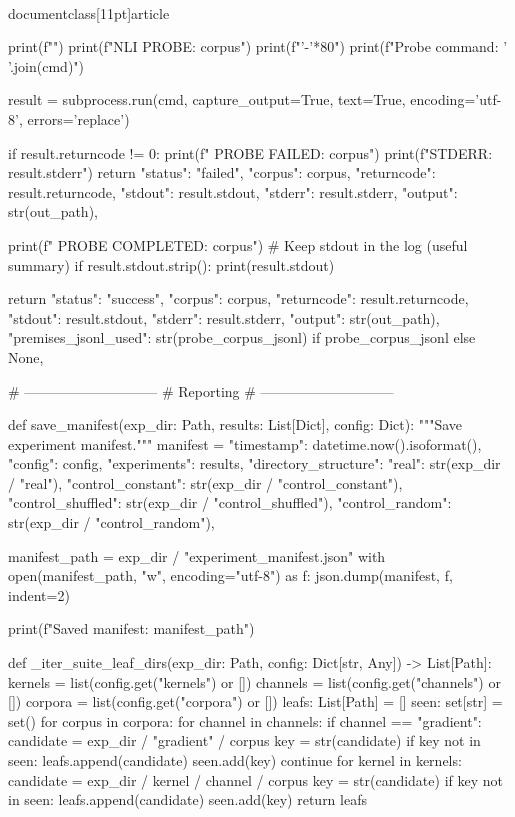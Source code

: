 \\documentclass[11pt]{article}
\begin{document}
\begin{CodeBlock}
    print(f"")
    print(f"NLI PROBE: {corpus}")
    print(f"{'-'*80}")
    print(f"Probe command: {' '.join(cmd)}")

    result = subprocess.run(cmd, capture_output=True, text=True, encoding='utf-8', errors='replace')

    if result.returncode != 0:
        print(f" PROBE FAILED: {corpus}")
        print(f"STDERR: {result.stderr}")
        return {
            "status": "failed",
            "corpus": corpus,
            "returncode": result.returncode,
            "stdout": result.stdout,
            "stderr": result.stderr,
            "output": str(out_path),
        }

    print(f" PROBE COMPLETED: {corpus}")
    # Keep stdout in the log (useful summary)
    if result.stdout.strip():
        print(result.stdout)

    return {
        "status": "success",
        "corpus": corpus,
        "returncode": result.returncode,
        "stdout": result.stdout,
        "stderr": result.stderr,
        "output": str(out_path),
        "premises_jsonl_used": str(probe_corpus_jsonl) if probe_corpus_jsonl else None,
    }


# -----------------------------
# Reporting
# -----------------------------

def save_manifest(exp_dir: Path, results: List[Dict], config: Dict):
    """Save experiment manifest."""
    manifest = {
        "timestamp": datetime.now().isoformat(),
        "config": config,
        "experiments": results,
        "directory_structure": {
            "real": str(exp_dir / "real"),
            "control_constant": str(exp_dir / "control_constant"),
            "control_shuffled": str(exp_dir / "control_shuffled"),
            "control_random": str(exp_dir / "control_random"),
        }
    }

    manifest_path = exp_dir / "experiment_manifest.json"
    with open(manifest_path, "w", encoding="utf-8") as f:
        json.dump(manifest, f, indent=2)

    print(f"\n Saved manifest: {manifest_path}")


def _iter_suite_leaf_dirs(exp_dir: Path, config: Dict[str, Any]) -> List[Path]:
    kernels = list(config.get("kernels") or [])
    channels = list(config.get("channels") or [])
    corpora = list(config.get("corpora") or [])
    leafs: List[Path] = []
    seen: set[str] = set()
    for corpus in corpora:
        for channel in channels:
            if channel == "gradient":
                candidate = exp_dir / "gradient" / corpus
                key = str(candidate)
                if key not in seen:
                    leafs.append(candidate)
                    seen.add(key)
                continue
            for kernel in kernels:
                candidate = exp_dir / kernel / channel / corpus
                key = str(candidate)
                if key not in seen:
                    leafs.append(candidate)
                    seen.add(key)
    return leafs



\end{CodeBlock}
\end{document}
